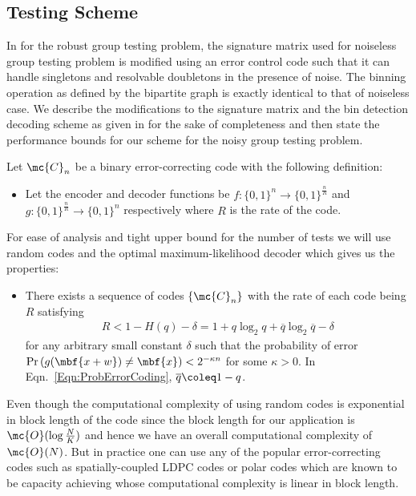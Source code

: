 \documentclass[conference,twocolumn]{IEEEtran}
\begin{document}
\subsection*{Testing Scheme}
In \cite{lee2015saffron} for the robust group testing problem, the signature matrix used for noiseless group testing problem is modified using an error control code such that it can handle singletons and resolvable doubletons in the presence of noise. The binning operation as defined by the bipartite graph is exactly identical to that of noiseless case. We describe the modifications to the signature matrix and the bin detection decoding scheme as given in \cite{lee2015saffron} for the sake of completeness and then state the performance bounds for our scheme for the noisy group testing problem.

Let $\mc{C}_n$ be a binary error-correcting code with the following definition:
\begin{itemize}
\item Let the encoder and decoder functions be $f:\{0,1\}^{n}\rightarrow \{0,1\}^{\frac{n}{R}}$ and $g:\{0,1\}^{\frac{n}{R}}\rightarrow \{0,1\}^{n}$ respectively where $R$ is the rate of the code.
\end{itemize}
 For ease of analysis and tight upper bound for the number of tests we will use random codes and the optimal maximum-likelihood decoder which gives us the properties:
\begin{itemize}
\item There exists a sequence of codes $\{\mc{C}_n\}$ with the rate of each code being $R$ satisfying 
\begin{align}
\label{Eqn:ProbErrorCoding}
R<1-H(q)-\delta=1+q\log_2 q+ \overline{q}\log_2\overline{q}-\delta
\end{align}
for any arbitrary small constant $\delta$ such that the probability of error $\text{Pr}\left(g(\mbf{x+w})\neq \mbf{x}\right)<2^{-\kappa n}$ for some $\kappa >0$. In Eqn.~\ref{Eqn:ProbErrorCoding}, $\overline{q}\coleq 1-q$. 
\end{itemize} 
Even though the computational complexity of using random codes is exponential in block length of the code since the block length for our application is $\mc{O}(\log \frac{N}{K})$ and hence we have an overall computational complexity of $\mc{O}(N)$. But in practice one can use any of the popular error-correcting codes such as spatially-coupled LDPC codes or polar codes which are known to be capacity achieving \cite{kumar2014threshold,kudekar2013spatially} whose computational complexity is linear in block length. 
\end{document}
